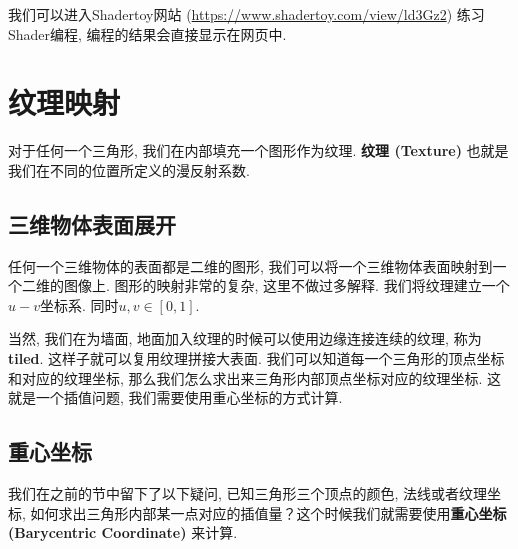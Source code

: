 \begin{information}
	我们可以进入Shadertoy网站 (\url{https://www.shadertoy.com/view/ld3Gz2}) 练习Shader编程, 编程的结果会直接显示在网页中. 
\end{information}

\chapter{纹理映射}

对于任何一个三角形, 我们在内部填充一个图形作为纹理. \textbf{纹理 (Texture) }也就是我们在不同的位置所定义的漫反射系数. 

\section{三维物体表面展开}

任何一个三维物体的表面都是二维的图形, 我们可以将一个三维物体表面映射到一个二维的图像上. 图形的映射非常的复杂, 这里不做过多解释. 我们将纹理建立一个$u-v$坐标系. 同时$u,v\in[0,1]$. 

当然, 我们在为墙面, 地面加入纹理的时候可以使用边缘连接连续的纹理, 称为\textbf{tiled}. 这样子就可以复用纹理拼接大表面. 我们可以知道每一个三角形的顶点坐标和对应的纹理坐标, 那么我们怎么求出来三角形内部顶点坐标对应的纹理坐标. 这就是一个插值问题, 我们需要使用重心坐标的方式计算. 

\section{重心坐标}
我们在之前的节中留下了以下疑问, 已知三角形三个顶点的颜色, 法线或者纹理坐标, 如何求出三角形内部某一点对应的插值量？这个时候我们就需要使用\textbf{重心坐标 (Barycentric Coordinate) }来计算. 

